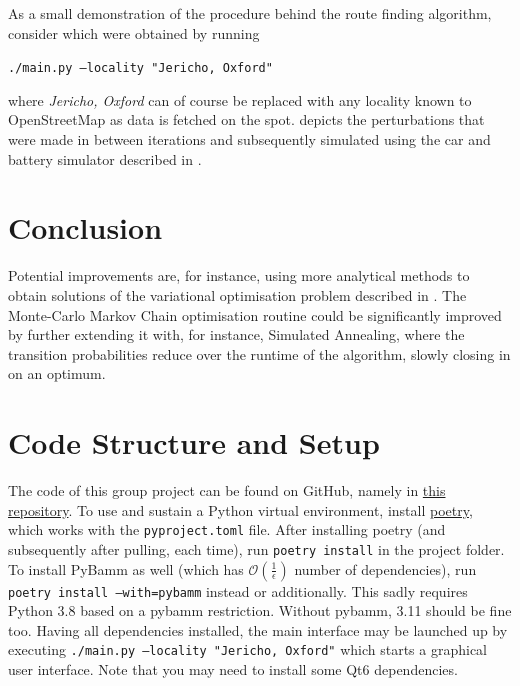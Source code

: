 \documentclass{prettytex/ox/mmsc-special-topic}
\begin{document}
  As a small demonstration of the procedure behind the route finding algorithm, consider  which were obtained by running \\
  \centerline{\texttt{./main.py --locality "Jericho, Oxford"}}
  where \textit{Jericho, Oxford} can of course be replaced with any locality known to OpenStreetMap as data is fetched on the spot.
   depicts the perturbations that were made in between iterations and subsequently simulated using the car and battery simulator described in .

  \section{Conclusion}
  \label{sec:discussion}

  Potential improvements are, for instance, using more analytical methods to obtain solutions of the variational optimisation problem described in .
  The Monte-Carlo Markov Chain optimisation routine could be significantly improved by further extending it with, for instance, Simulated Annealing, where the transition probabilities reduce over the runtime of the algorithm, slowly closing in on an optimum.

  \pagebreak
  \printbibliography

  \pagebreak
  \appendix

  \section{Code Structure and Setup}
  \label{sec:code}
  The code of this group project can be found on GitHub, namely in \href{https://github.com/MrP01/BatteryModelling}{this repository}.
  To use and sustain a Python virtual environment, install
  \href{https://python-poetry.org/}{poetry}, which works with the
  \texttt{pyproject.toml} file. After installing poetry (and subsequently
  after pulling, each time), run
  \texttt{poetry install}
  in the project folder. To install PyBamm as well (which has $\mathcal{O}(\frac{1}{\epsilon})$ number of dependencies), run
  \texttt{poetry install --with=pybamm}
  instead or additionally. This sadly requires Python 3.8 based on a
  pybamm restriction. Without pybamm, 3.11 should be fine too.
  Having all dependencies installed, the main interface may be launched up
  by executing \texttt{./main.py --locality "Jericho, Oxford"}
  which starts a graphical user interface. Note that you may need to install some Qt6 dependencies.
\end{document}
